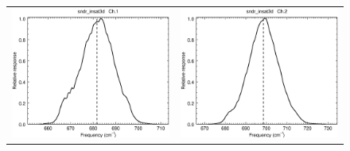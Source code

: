\begin{figure}[H]
  \centering
  \begin{tabular}{c c}
    \includegraphics[scale=0.35]{graphics/sndr/srf/sndr_insat3d-1.eps} &
    \includegraphics[scale=0.35]{graphics/sndr/srf/sndr_insat3d-2.eps} \\

\end{tabular}
\end{figure}

